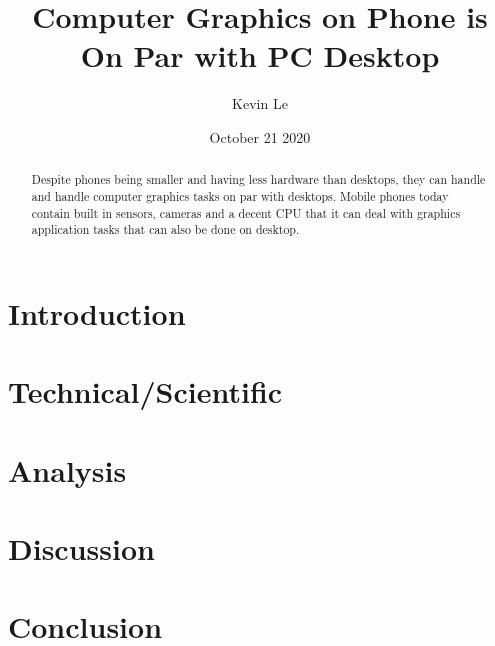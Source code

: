 \documentclass{article}
\title{Computer Graphics on Phone is On Par with PC Desktop}
\author{Kevin Le}
\date{October 21 2020}
\begin{document}
\maketitle

\begin{abstract}
Despite phones being smaller and having less hardware than desktops, they can handle and handle computer graphics tasks on par with desktops. Mobile phones today contain built in sensors, cameras and a decent CPU that it can deal with graphics application tasks that can also be done on desktop.
\end{abstract}

\section{Introduction}

\section{Technical/Scientific}

\section{Analysis}

\section{Discussion}

\section{Conclusion}



\end{document}
